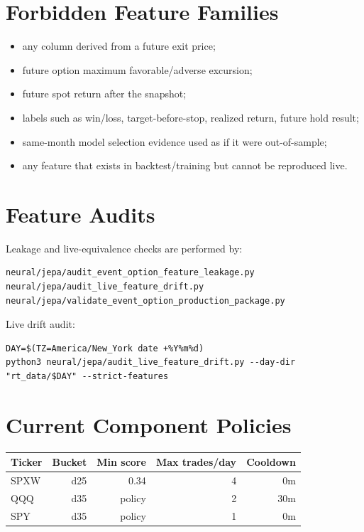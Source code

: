 \documentclass[11pt,a4paper]{article}
\begin{document}
\section{Forbidden Feature Families}

\begin{itemize}
  \item any column derived from a future exit price;
  \item future option maximum favorable/adverse excursion;
  \item future spot return after the snapshot;
  \item labels such as win/loss, target-before-stop, realized return, future hold result;
  \item same-month model selection evidence used as if it were out-of-sample;
  \item any feature that exists in backtest/training but cannot be reproduced live.
\end{itemize}

\section{Feature Audits}

Leakage and live-equivalence checks are performed by:

\begin{lstlisting}
neural/jepa/audit_event_option_feature_leakage.py
neural/jepa/audit_live_feature_drift.py
neural/jepa/validate_event_option_production_package.py
\end{lstlisting}

Live drift audit:

\begin{lstlisting}
DAY=$(TZ=America/New_York date +%Y%m%d)
python3 neural/jepa/audit_live_feature_drift.py --day-dir "rt_data/$DAY" --strict-features
\end{lstlisting}

\section{Current Component Policies}

\begin{center}
\begin{tabular}{lrrrr}
\toprule
Ticker & Bucket & Min score & Max trades/day & Cooldown \\
\midrule
SPXW & d25 & 0.34 & 4 & 0m \\
QQQ & d35 & policy & 2 & 30m \\
SPY & d35 & policy & 1 & 0m \\
\bottomrule
\end{tabular}
\end{center}
\end{document}

